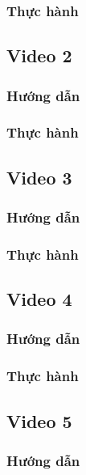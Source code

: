 \documentclass{article}
\begin{document}
 



\subsubsection{Thực hành}



\subsection{Video 2}
\subsubsection{Hướng dẫn}

\subsubsection{Thực hành}




\subsection{Video 3}
\subsubsection{Hướng dẫn}

\subsubsection{Thực hành}




\subsection{Video 4}
\subsubsection{Hướng dẫn}

\subsubsection{Thực hành}




\subsection{Video 5}
\subsubsection{Hướng dẫn}
\end{document}
